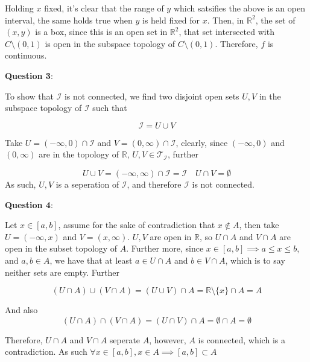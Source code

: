 \documentclass{article} %
\newcommand{\question}[2][]{
  \begin{flushleft}
    \textbf{Question #1}: \textit{#2}

\end{flushleft}}
\begin{document}
Holding $x$ fixed, it's clear that the range of $y$ which satsifies
the above is an open interval, the same holds true when $y$ is held
fixed for $x$. Then, in $\mathbb{R}^2$, the set of $(x,y)$ is a box,
since this is an open set in $\mathbb{R}^2$, that set intersected
with $C\setminus(0,1)$ is open in the subspace topology of
$C\setminus(0,1)$. Therefore, $f$ is continuous.

\question[3]{}
To show that $\mathcal{I}$ is not connected, we find two disjoint
open sets $U, V$ in the subspace topology of $\mathcal{I}$ such that

$$
\mathcal{I} = U \cup V
$$

Take $U = (-\infty, 0) \cap \mathcal{I}$ and $V = (0,\infty) \cap
\mathcal{I}$, clearly, since $(-\infty, 0)$ and $(0, \infty)$ are in
the topology of $\mathbb{R}$, $U, V  \in \mathcal{T}_\mathcal{I}$, further

$$
U \cup V = (-\infty, \infty)  \cap \mathcal{I} = \mathcal{I} \quad U
\cap V = \emptyset
$$
As such, $U,V$ is a seperation of $\mathcal{I}$, and therefore
$\mathcal{I}$ is not connected.
\question[4]{}

Let $x \in [a,b]$, assume for the sake of contradiction that $x
\notin A$, then take $U = (-\infty, x)$ and $V = (x, \infty)$. $U,V$
are open in $\mathbb{R}$, so $U \cap A$ and $V \cap A$ are open in
the subset topology of $A$. Further more, since $x\in [a,b] \implies a
\leq x \leq b$, and $a,b \in A$, we have that at least $a \in U \cap
A$ and $b \in V \cap A$, which is to say neither sets are empty. Further

$$
(U \cap A) \cup (V \cap A)  = (U \cup V) \cap A = \mathbb{R}\setminus
\{x\} \cap A = A
$$

And also
$$
(U \cap A) \cap (V \cap A) = (U \cap V) \cap A  = \emptyset \cap A = \emptyset
$$

Therefore, $U\cap A$ and $V \cap A$ seperate $A$, however, $A$ is
connected, which is a contradiction. As such $\forall x \in [a,b],
x\in A \implies [a,b] \subset A$
\end{document}
